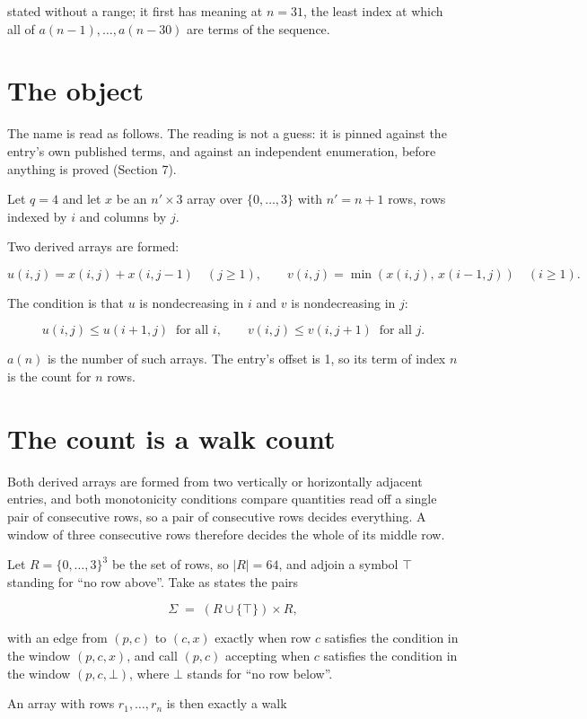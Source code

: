 \documentclass[11pt]{article}
\theoremstyle{definition}
\begin{document}
stated without a range; it first has meaning at $n = 31$, the least index at which all of $a(n-1),\dots,a(n-30)$ are terms of the sequence.

\section{The object}

The name is read as follows. The reading is not a guess: it is pinned against the entry's own published terms, and against an independent enumeration, before anything is proved (Section 7).

Let $q = 4$ and let $x$ be an $n' \times 3$ array over $\{0,\dots,3\}$ with $n' = n + 1$ rows, rows indexed by $i$ and columns by $j$.

Two derived arrays are formed:

\[u(i,j) = x(i,j) + x(i,j{-}1)\quad (j \ge 1), \qquad v(i,j) = \min(x(i,j),\,x(i{-}1,j))\quad (i \ge 1).\]

The condition is that $u$ is nondecreasing in $i$ and $v$ is nondecreasing in $j$:

\[u(i,j) \le u(i{+}1,j) \ \text{ for all } i, \qquad v(i,j) \le v(i,j{+}1) \ \text{ for all } j.\]

$a(n)$ is the number of such arrays. The entry's offset is 1, so its term of index $n$ is the count for $n$ rows.

\section{The count is a walk count}

Both derived arrays are formed from two vertically or horizontally adjacent entries, and both monotonicity conditions compare quantities read off a single pair of consecutive rows, so a pair of consecutive rows decides everything. A window of three consecutive rows therefore decides the whole of its middle row.

Let $R = \{0,\dots,3\}^{3}$ be the set of rows, so $|R| = 64$, and adjoin a symbol $\top$ standing for ``no row above''. Take as states the pairs

\[\Sigma \;=\; (R \cup \{\top\}) \times R,\]

with an edge from $(p,c)$ to $(c,x)$ exactly when row $c$ satisfies the condition in the window $(p,c,x)$, and call $(p,c)$ accepting when $c$ satisfies the condition in the window $(p,c,\bot)$, where $\bot$ stands for ``no row below''.

An array with rows $r_1,\dots,r_n$ is then exactly a walk
\end{document}
